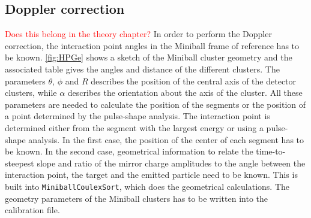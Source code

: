 \documentclass[twoside,english]{uiofysmaster/uiofysmaster}
\let\orgautoref\autoref
\renewcommand{\autoref}
        {%
		 \def\sectionautorefname{Section}%
		 \def\subsectionautorefname{Section}%
		 \def\subsubsectionautorefname{Section}%
		 \def\chapterautorefname{Chapter}%
          \orgautoref}
\begin{document}
\subsection{Doppler correction}\label{ssec:Doppler}
\textcolor{red}{Does this belong in the theory chapter?}\newline
In order to perform the Doppler correction, the interaction point angles in the Miniball frame of reference has to be known. 
\autoref{fig:HPGe} shows a sketch of the Miniball cluster geometry and the associated table gives the angles and distance of the different clusters.
The parameters $\theta$, $\phi$ and $R$ describes the position of the central axis of the detector clusters, while $\alpha$ describes the orientation about the axis of the cluster. 
All these parameters are needed to calculate the position of the segments or the position of a point determined by the pulse-shape analysis. 
The interaction point is determined either from the segment with the largest energy or using a pulse-shape analysis. 
In the first case, the position of the center of each segment has to be known.
In the second case, geometrical information to relate the time-to-steepest slope and ratio of the mirror charge amplitudes to the angle between the interaction point, the target and the emitted particle need to be known. 
This is built into \texttt{MiniballCoulexSort}, which does the geometrical calculations. 
The geometry parameters of the Miniball clusters has to be written into the calibration file. 
\end{document}
